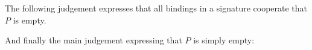 \documentclass[12pt]{article}
\begin{document}
The following judgement expresses that all bindings in a signature cooperate that $P$ is empty.

{ %
\vspace{0.5cm}
\noindent {}

\begin{prooftree}
\end{prooftree}

\begin{prooftree}
\end{prooftree}

\begin{prooftree}
\end{prooftree}

\vspace{0.5cm}
}

And finally the main judgement expressing that $P$ is simply empty:

{ %
\vspace{0.5cm}
\noindent {}

\begin{prooftree}
\end{prooftree}

\vspace{0.5cm}
}
\end{document}
